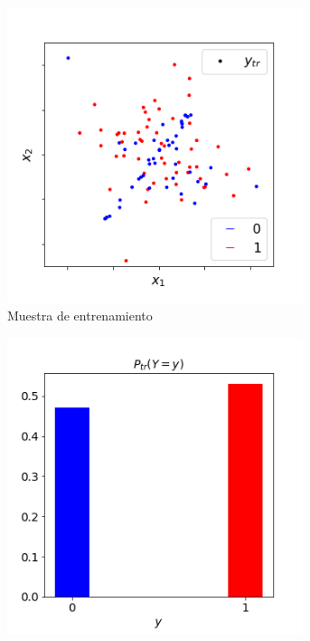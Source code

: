 \begin{figure}[!h]
    \centering
    \begin{subfigure}[t]{0.45\textwidth}
        \centering
        \includegraphics[width=0.95\textwidth]{../plots_teoria/cambios_train_scatterplot.png}
        \caption{Muestra de entrenamiento}\label{cambios:datos_tr}
    \end{subfigure}
    \hfill
    \begin{subfigure}[t]{0.45\textwidth}
        \centering
        \includegraphics[width=0.95\textwidth]{../plots_teoria/cambios_train_barplot.png}

\end{subfigure}
\end{figure}
